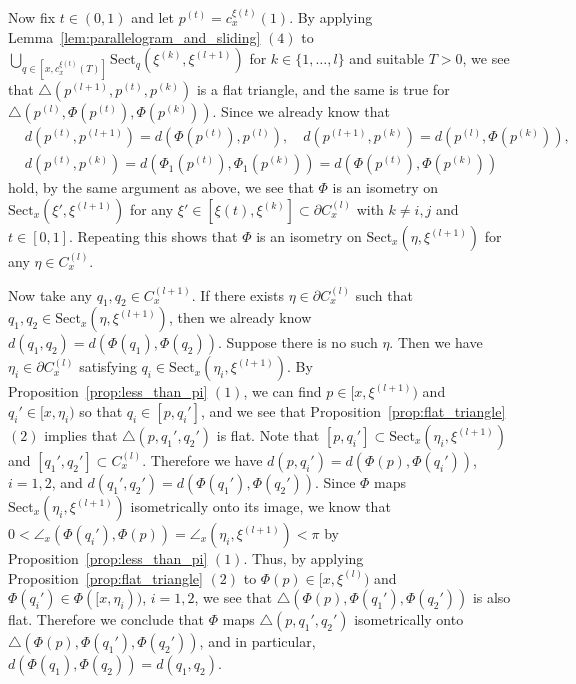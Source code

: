 \documentclass[12pt]{amsart}
\numberwithin{equation}{section}
\theoremstyle{plain}
\theoremstyle{definition}
\theoremstyle{remark}
\newcommand{\p}[1]{p^{(#1)}}
\newcommand{\xxi}[1]{\xi^{(#1)}}
\newcommand{\ray}[1]{[#1)}
\newcommand{\cc}[2]{c_{#1}^{#2}}
\newcommand{\tri}[3]{\triangle(#1,#2,#3)}
\newcommand{\sect}[3][]{\mathrm{Sect}_{#1}(#2,#3)}
\newcommand{\cone}[2][]{C_{#1}^{(#2)}}
\begin{document}
 Now fix $t \in (0,1)$ and let $\p{t}=\cc{x}{\xi(t)}(1)$. 
 By applying Lemma~\ref{lem:parallelogram_and_sliding} $(4)$ to
 $\bigcup_{q \in [x,\cc{x}{\xi(t)}(T)]}\sect[q]{\xxi{k}}{\xxi{l+1}}$
 for $k \in \{1,\dots, l\}$ and suitable $T>0$, 
 we see that $\tri{\p{l+1}}{\p{t}}{\p{k}}$ is a flat triangle, and the
 same is true for $\tri{\p{l}}{\Phi(\p{t})}{\Phi(\p{k})}$. 
 Since we already know that
\begin{equation*}
\begin{split}
 & d(\p{t},\p{l+1})=d(\Phi(\p{t}),\p{l}), \quad
 d(\p{l+1},\p{k})=d(\p{l},\Phi(\p{k})), \\
 & d(\p{t},\p{k})=d(\Phi_1(\p{t}),\Phi_1(\p{k}))
 =d(\Phi(\p{t}),\Phi(\p{k}))
\end{split}
\end{equation*} 
hold,  by the same argument as above, we see that $\Phi$ is an isometry on 
 $\sect[x]{\xi'}{\xxi{l+1}}$ for any 
 $\xi' \in [\xi(t),\xxi{k}] \subset \partial\cone[x]{l}$ with 
 $k \not=i,j$ and $t \in [0,1]$. 
 Repeating this shows that
 $\Phi$ is an isometry on $\sect[x]{\eta}{\xxi{l+1}}$ for
 any $\eta \in \cone[x]{l}$.  

 Now take any $q_1,q_2 \in \cone[x]{l+1}$. 
 If there exists $\eta \in \partial \cone[x]{l}$ such that 
 $q_1,q_2 \in \sect[x]{\eta}{\xxi{l+1}}$, then we already know
 $d(q_1,q_2)=d(\Phi(q_1),\Phi(q_2))$. 
 Suppose there is no such $\eta$.
 Then we have $\eta_i \in \partial \cone[x]{l}$ satisfying 
 $q_i \in \sect[x]{\eta_i}{\xxi{l+1}}$.  
  By Proposition~\ref{prop:less_than_pi} $(1)$,
 we can find $p \in \ray{x,\xxi{l+1}}$ and
 $q_i' \in \ray{x,\eta_i}$ so that $q_i \in [p,q_i']$, 
 and we see that 
 Proposition~\ref{prop:flat_triangle} $(2)$ implies that 
 $\tri{p}{q_1'}{q_2'}$ is flat. 
 Note that 
 $[p,q_i'] \subset \sect[x]{\eta_i}{\xxi{l+1}}$ and  
 $[q_1',q_2']\subset \cone[x]{l}$. 
 Therefore we have $d(p,q_i')=d(\Phi(p),\Phi(q_i'))$, $i=1,2$, and 
 $d(q_1',q_2')=d(\Phi(q_1'),\Phi(q_2'))$. 
 Since $\Phi$ maps $\sect[x]{\eta_i}{\xxi{l+1}}$ isometrically onto its
 image,  we know that 
 $0<\angle_{x}(\Phi(q_i'),\Phi(p))=\angle_{x}(\eta_i,\xxi{l+1})<\pi$
 by Proposition~\ref{prop:less_than_pi} $(1)$.
 Thus, by applying Proposition~\ref{prop:flat_triangle} $(2)$ to 
 $\Phi(p) \in \ray{x,\xxi{l}}$ and  
 $\Phi(q_i') \in \Phi(\ray{x,\eta_i})$, $i=1,2$, 
 we see that 
 $\tri{\Phi(p)}{\Phi(q_1')}{\Phi(q_2')}$ is also flat.
 Therefore we conclude that $\Phi$ maps $\tri{p}{q_1'}{q_2'}$
 isometrically onto $\tri{\Phi(p)}{\Phi(q_1')}{\Phi(q_2')}$, and
 in particular, $d(\Phi(q_1),\Phi(q_2))=d(q_1,q_2)$. 
\end{document}
